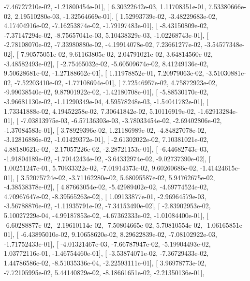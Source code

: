 \documentclass{article}
\begin{document}
         -7.46727210e-02,  -1.21800454e-01],
       [  6.30322642e-03,   1.11708351e-01,   7.53380666e-02,
          2.19510280e-03,  -1.32564669e-01],
       [  1.52993739e-02,  -3.48229683e-02,   4.17404916e-02,
         -7.16253874e-02,  -1.79197483e-01],
       [ -8.43150809e-02,  -7.37147294e-02,  -8.75657041e-03,
          5.10438329e-03,  -1.02268743e-01],
       [ -2.78108070e-02,  -7.33980880e-02,  -4.19914078e-02,
          7.23661277e-02,  -3.54577348e-02],
       [  7.90575051e-02,   9.61163805e-02,   2.04791021e-02,
          3.64814560e-02,  -3.48582493e-02],
       [ -2.75465032e-02,  -5.60509674e-02,   8.41249136e-02,
          9.50628681e-02,  -1.27188662e-01],
       [  1.11978852e-01,   7.20979063e-02,  -3.51030881e-02,
         -7.52203410e-02,  -1.77108694e-01],
       [  7.72546957e-02,   4.75872923e-02,  -9.99038540e-02,
          9.87901922e-02,  -1.42180708e-01],
       [ -5.88530170e-02,  -3.96681130e-02,  -1.11290349e-04,
          4.59578248e-03,  -1.54041782e-01],
       [  1.73341888e-02,   4.19452258e-02,   7.30641842e-02,
          5.10116919e-02,  -1.62913284e-01],
       [ -7.03813975e-03,  -6.57136303e-03,  -3.78033454e-02,
         -2.69402806e-02,  -1.37084583e-01],
       [  3.78929396e-02,   1.21186989e-02,  -4.84827078e-02,
         -3.12816886e-02,  -1.01429372e-01],
       [ -2.61302022e-02,   7.10381021e-02,   4.88180621e-02,
         -2.17057226e-02,  -2.28721153e-01],
       [ -6.44682743e-03,  -1.91804189e-02,  -1.70142434e-02,
         -3.64332974e-02,  -9.02737390e-02],
       [  1.00251247e-01,   5.70933322e-02,  -7.01914373e-02,
          9.60260686e-02,  -1.41424615e-01],
       [  3.52075724e-02,  -3.71162280e-02,   5.68095587e-02,
          5.94762675e-02,  -4.38538378e-02],
       [  4.87663054e-02,  -5.42989402e-02,  -4.69774524e-02,
          4.70967647e-02,  -8.39565263e-02],
       [  1.09133877e-01,  -2.96964579e-03,  -3.56788876e-02,
         -1.11935791e-02,  -7.34153490e-02],
       [ -2.83902953e-02,   5.10027229e-04,  -4.99187853e-02,
         -4.67362333e-02,  -1.01084400e-01],
       [ -6.60288877e-02,  -2.19610114e-02,  -7.50804665e-02,
          5.70810554e-02,  -1.06165851e-01],
       [ -6.43895010e-02,   9.10658620e-02,   8.29622839e-02,
         -7.08102922e-03,  -1.71752433e-01],
       [ -4.01321467e-03,  -7.66787947e-02,  -5.19904493e-02,
          1.03772116e-01,  -1.46754460e-01],
       [ -3.53874071e-02,  -7.36729433e-02,   1.44786586e-02,
         -8.51035336e-04,  -2.22593111e-01],
       [  3.96978773e-02,  -7.72105995e-02,   5.44140829e-02,
         -8.18661651e-02,  -2.21350136e-01],
\end{document}

